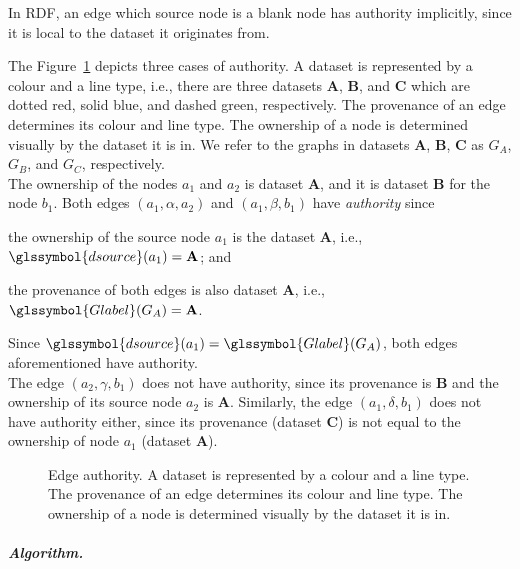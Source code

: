 \begin{remark}
	In RDF, an edge which source node is a blank node has authority implicitly, since it is local to the dataset it originates from.
\end{remark}

The Figure~\ref{fig:authority} depicts three cases of authority. A dataset is represented by a colour and a line type, i.e., there are three datasets {\bfseries A}, {\bfseries B}, and {\bfseries C} which are dotted red, solid blue, and dashed green, respectively. The provenance of an edge determines its colour and line type. The ownership of a node is determined visually by the dataset it is in. We refer to the graphs in datasets \textbf{A}, \textbf{B}, \textbf{C} as $G_A$, $G_B$, and $G_C$, respectively.\\

The ownership of the nodes $a_1$ and $a_2$ is dataset {\bfseries A}, and it is dataset {\bfseries B} for the node $b_1$. Both edges $(a_1, \alpha, a_2)$ and $\left(a_1, \beta, b_1 \right)$ have \emph{authority} since
\begin{inparaenum}[(1)]
	\item the ownership of the source node $a_1$ is the dataset {\bfseries A}, i.e., $\glssymbol{dsource}(a_1) = \textbf{A}$; and
	\item the provenance of both edges is also dataset {\bfseries A}, i.e., $\glssymbol{Glabel}(G_A) = \textbf{A}$.
\end{inparaenum}
Since $\glssymbol{dsource}(a_1) = \glssymbol{Glabel}(G_A)$, both edges aforementioned have authority.\\

The edge $\left(a_2, \gamma, b_1\right)$ does not have authority, since its provenance is {\bfseries B} and the ownership of its source node $a_2$ is {\bfseries A}. Similarly, the edge $\left(a_1,\delta,b_1\right)$ does not have authority either, since its provenance (dataset \textbf{C}) is not equal to the ownership of node $a_1$ (dataset \textbf{A}).

\begin{figure}
	\centering
	
	\caption[Edge authority]{Edge authority. A dataset is represented by a colour and a line type. The provenance of an edge determines its colour and line type. The ownership of a node is determined visually by the dataset it is in.}
	\label{fig:authority}
\end{figure}

\subparagraph{Algorithm.}

